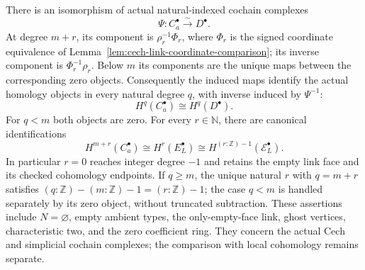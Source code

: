 \begin{lemma}
There is an isomorphism of actual natural-indexed cochain complexes
\[
 \Psi:C^\bullet_a\xrightarrow{\ \sim\ }D^\bullet.
\]
At degree $m+r$, its component is $\rho_r^{-1}\Phi_r$, where
$\Phi_r$ is the signed coordinate equivalence of
Lemma~\ref{lem:cech-link-coordinate-comparison}; its inverse component
is $\Phi_r^{-1}\rho_r$. Below $m$ its components are the unique maps
between the corresponding zero objects.
Consequently the induced maps identify the actual homology objects
in every natural degree $q$, with inverse induced by $\Psi^{-1}$:
\[
 H^q(C^\bullet_a)\cong H^q(D^\bullet).
\]
For $q<m$ both objects are zero. For every $r\in\mathbb N$, there are
canonical identifications
\[
 H^{m+r}(C^\bullet_a)
   \cong H^r(E_L^\bullet)
   \cong H^{(r:\mathbb Z)-1}(\mathcal E_L^\bullet).
\]
In particular $r=0$ reaches integer degree $-1$ and retains the empty
link face and its checked cohomology endpoints. If $q\geq m$, the
unique natural $r$ with $q=m+r$ satisfies
$(q:\mathbb Z)-(m:\mathbb Z)-1=(r:\mathbb Z)-1$; the case $q<m$ is
handled separately by its zero object, without truncated subtraction.
These assertions include $N=\varnothing$, empty ambient types, the
only-empty-face link, ghost vertices, characteristic two, and the zero
coefficient ring. They concern the actual Cech and simplicial cochain
complexes; the comparison with local cohomology remains separate.
\end{lemma}
